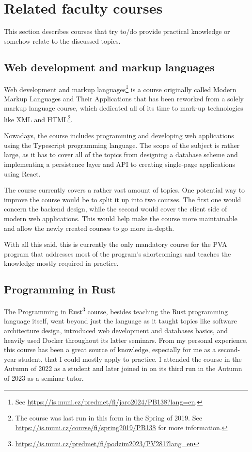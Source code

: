 \documentclass[
  digital,
  color,
  oneside,
  nosansbold,
  nocolorbold,
  lof,
  lot,
]{fithesis4}
\begin{document}
\section{Related faculty courses}

This section describes courses that try to/do provide practical knowledge or somehow relate to the discussed topics.

\subsection{Web development and markup languages}\label{web-dev}

Web development and markup languages\footnote{See \url{https://is.muni.cz/predmet/fi/jaro2024/PB138?lang=en}.}
is a course originally called Modern Markup Languages and Their Applications that has been reworked from a solely markup language course, which dedicated all of its time to mark-up technologies like XML and HTML\footnote{The course was last run in this form in the Spring of 2019. See \url{https://is.muni.cz/course/fi/spring2019/PB138} for more information.}.

Nowadays, the course includes programming and developing web applications using the Typescript programming language. The scope of the subject is rather large, as it has to cover all of the topics from designing a database scheme and implementing a persistence layer and API to creating single-page applications using React.

The course currently covers a rather vast amount of topics. One potential way to improve the course would be to split it up into two courses. The first one would concern the backend design, while the second would cover the client side of modern web applications. This would help make the course more maintainable and allow the newly created courses to go more in-depth.

With all this said, this is currently the only mandatory course for the PVA program that addresses most of the program's shortcomings and teaches the knowledge mostly required in practice.

\subsection{Programming in Rust}\label{rust-course}

The Programming in Rust\footnote{\url{https://is.muni.cz/predmet/fi/podzim2023/PV281?lang=en}} course, besides teaching the Rust programming language itself, went beyond just the language as it taught topics like software architecture design, introduced web development and databases basics, and heavily used Docker throughout its latter seminars. From my personal experience, this course has been a great source of knowledge, especially for me as a second-year student, that I could mostly apply to practice. I attended the course in the Autumn of 2022 as a student and later joined in on its third run in the Autumn of 2023 as a seminar tutor.
\end{document}
